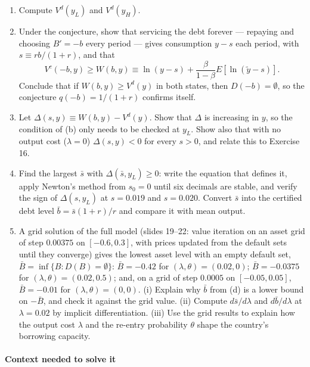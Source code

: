 \documentclass[11pt,a4paper]{article}
\begin{document}
\begin{enumerate}
\def\labelenumi{(\alph{enumi})}
\item
  Compute \(V^d(y_L)\) and \(V^d(y_H)\).
\item
  Under the conjecture, show that servicing the debt forever --- repaying and choosing \(B' = -b\)
  every period --- gives consumption \(y - s\) each period, with \(s \equiv rb/(1 + r)\), and that
  \[V^c(-b, y) \ge W(b, y) \equiv \ln(y - s) + \frac{\beta}{1 - \beta}E[\ln(\tilde y - s)].\]
  Conclude that if \(W(b, y) \ge V^d(y)\) in both states, then \(D(-b) = \emptyset\), so the
  conjecture \(q(-b) = 1/(1 + r)\) confirms itself.
\item
  Let \(\Delta(s, y) \equiv W(b, y) - V^d(y)\). Show that \(\Delta\) is increasing in \(y\), so the
  condition of (b) only needs to be checked at \(y_L\). Show also that with no output cost
  (\(\lambda = 0\)) \(\Delta(s, y) < 0\) for every \(s > 0\), and relate this to Exercise 16.
\item
  Find the largest \(\bar s\) with \(\Delta(\bar s, y_L) \ge 0\): write the equation that defines
  it, apply Newton's method from \(s_0 = 0\) until six decimals are stable, and verify the sign of
  \(\Delta(s, y_L)\) at \(s = 0.019\) and \(s = 0.020\). Convert \(\bar s\) into the certified debt
  level \(\bar b = \bar s(1 + r)/r\) and compare it with mean output.
\item
  A grid solution of the full model (slides 19--22: value iteration on an asset grid of step
  \(0.00375\) on \([-0.6, 0.3]\), with prices updated from the default sets until they converge)
  gives the lowest asset level with an empty default set, \(\bar B = \inf\{B : D(B) = \emptyset\}\):
  \(\bar B = -0.42\) for \((\lambda, \theta) = (0.02, 0)\); \(\bar B = -0.0375\) for
  \((\lambda, \theta) = (0.02, 0.5)\); and, on a grid of step \(0.0005\) on \([-0.05, 0.05]\),
  \(\bar B = -0.01\) for \((\lambda, \theta) = (0, 0)\). (i) Explain why \(\bar b\) from (d) is a
  lower bound on \(-\bar B\), and check it against the grid value. (ii) Compute \(d\bar s/d\lambda\)
  and \(d\bar b/d\lambda\) at \(\lambda = 0.02\) by implicit differentiation. (iii) Use the grid
  results to explain how the output cost \(\lambda\) and the re-entry probability \(\theta\) shape
  the country's borrowing capacity.
\end{enumerate}

\paragraph{Context needed to solve it}
\end{document}
